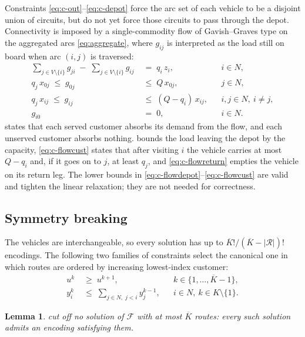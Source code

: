 \documentclass[11pt,a4paper]{article}
\theoremstyle{definition}
\theoremstyle{plain}
\newtheorem{lemma}[definition]{Lemma}
\newcommand{\Feas}{\mathcal{F}}
\newcommand{\Routes}{\mathcal{R}}
\newcommand{\Cust}{N}
\newcommand{\Nodes}{V}
\newcommand{\Veh}{K}
\begin{document}
Constraints \eqref{eq:c-out}--\eqref{eq:c-depot} force the arc set of each
vehicle to be a disjoint union of circuits, but do not yet force those circuits
to pass through the depot.  Connectivity is imposed by a single-commodity flow
of Gavish--Graves type \cite{GavishGraves1978} on the aggregated arcs
\eqref{eq:aggregate}, where $g_{ij}$ is interpreted as the load still on board
when arc $(i,j)$ is traversed:
\begin{align}
  \sum_{j \in \Nodes \setminus \{i\}} g_{ji}
  \;-\; \sum_{j \in \Nodes \setminus \{i\}} g_{ij}
  &\;=\; q_i\, z_i,
  & &i \in \Cust, \label{eq:c-flowcons}\\
  q_j\, x_{0j} \;\le\; g_{0j} &\;\le\; Q\, x_{0j},
  & &j \in \Cust, \label{eq:c-flowdepot}\\
  q_j\, x_{ij} \;\le\; g_{ij} &\;\le\; (Q - q_i)\, x_{ij},
  & &i,j \in \Cust,\ i \ne j, \label{eq:c-flowcust}\\
  g_{i0} &\;=\; 0,
  & &i \in \Cust. \label{eq:c-flowreturn}
\end{align}
 states that each served customer absorbs its demand from
the flow, and each unserved customer absorbs nothing.  
bounds the load leaving the depot by the capacity, \cref{eq:c-flowcust} states
that after visiting $i$ the vehicle carries at most $Q - q_i$ and, if it goes
on to $j$, at least $q_j$, and \cref{eq:c-flowreturn} empties the vehicle on
its return leg.  The lower bounds in
\eqref{eq:c-flowdepot}--\eqref{eq:c-flowcust} are valid and tighten the linear
relaxation; they are not needed for correctness.

\subsection{Symmetry breaking}
\label{sec:milp-symmetry}

The vehicles are interchangeable, so every solution has up to
$\overline{K}!/(\overline{K}-|\Routes|)!$ encodings.  The following two
families of constraints select the canonical one in which routes are ordered by
increasing lowest-index customer:
\begin{align}
  u^{k} &\;\ge\; u^{k+1},
  & &k \in \{1,\dots,\overline{K}-1\}, \label{eq:c-sym1}\\
  y^k_i &\;\le\; \sum_{j \in \Cust,\; j < i} y^{k-1}_j,
  & &i \in \Cust,\ k \in \Veh \setminus \{1\}. \label{eq:c-sym2}
\end{align}

\begin{lemma}
\label{lem:symmetry}
 cut off no solution of $\Feas$ with at most
$\overline{K}$ routes: every such solution admits an encoding satisfying them.
\end{lemma}
\end{document}
